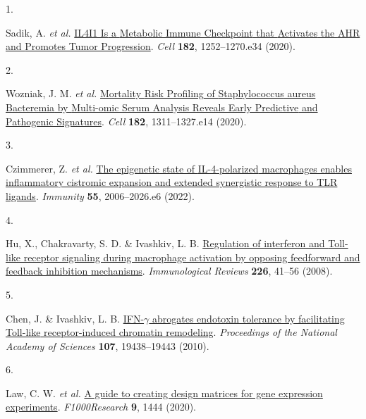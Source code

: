 \documentclass[
]{article}
\newlength{\cslhangindent}
\newlength{\csllabelwidth}
\newlength{\cslentryspacingunit} %
\newenvironment{CSLReferences}[2] %
 {%
  \setlength{\parindent}{0pt}
  \ifodd #1
  \let\oldpar\par
  \def\par{\hangindent=\cslhangindent\oldpar}
  \fi
  \setlength{\parskip}{#2\cslentryspacingunit}
 }%
 {}
\newcommand{\CSLLeftMargin}[1]{\parbox[t]{\csllabelwidth}{#1}}
\newcommand{\CSLRightInline}[1]{\parbox[t]{\linewidth - \csllabelwidth}{#1}\break}
\begin{document}
\hypertarget{refs}{}
\begin{CSLReferences}{0}{0}
\leavevmode{}%
\CSLLeftMargin{1. }%
\CSLRightInline{Sadik, A. \emph{et al.} \href{https://doi.org/10.1016/j.cell.2020.07.038}{{IL4I1 Is} a {Metabolic Immune Checkpoint} that {Activates} the {AHR} and {Promotes Tumor Progression}}. \emph{Cell} \textbf{182}, 1252--1270.e34 (2020).}

\leavevmode{}%
\CSLLeftMargin{2. }%
\CSLRightInline{Wozniak, J. M. \emph{et al.} \href{https://doi.org/10.1016/j.cell.2020.07.040}{Mortality {Risk Profiling} of {Staphylococcus} aureus {Bacteremia} by {Multi-omic Serum Analysis Reveals Early Predictive} and {Pathogenic Signatures}}. \emph{Cell} \textbf{182}, 1311--1327.e14 (2020).}

\leavevmode{}%
\CSLLeftMargin{3. }%
\CSLRightInline{Czimmerer, Z. \emph{et al.} \href{https://doi.org/10.1016/j.immuni.2022.10.004}{The epigenetic state of {IL-4-polarized} macrophages enables inflammatory cistromic expansion and extended synergistic response to {TLR} ligands}. \emph{Immunity} \textbf{55}, 2006--2026.e6 (2022).}

\leavevmode{}%
\CSLLeftMargin{4. }%
\CSLRightInline{Hu, X., Chakravarty, S. D. \& Ivashkiv, L. B. \href{https://doi.org/10.1111/j.1600-065X.2008.00707.x}{Regulation of interferon and {Toll-like} receptor signaling during macrophage activation by opposing feedforward and feedback inhibition mechanisms}. \emph{Immunological Reviews} \textbf{226}, 41--56 (2008).}

\leavevmode{}%
\CSLLeftMargin{5. }%
\CSLRightInline{Chen, J. \& Ivashkiv, L. B. \href{https://doi.org/10.1073/pnas.1007816107}{{IFN-\(\gamma\)} abrogates endotoxin tolerance by facilitating {Toll-like} receptor-induced chromatin remodeling}. \emph{Proceedings of the National Academy of Sciences} \textbf{107}, 19438--19443 (2010).}

\leavevmode{}%
\CSLLeftMargin{6. }%
\CSLRightInline{Law, C. W. \emph{et al.} \href{https://doi.org/10.12688/f1000research.27893.1}{A guide to creating design matrices for gene expression experiments}. \emph{F1000Research} \textbf{9}, 1444 (2020).}

\end{CSLReferences}
\end{document}
